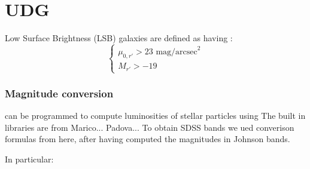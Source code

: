 \chapter{UDG}

Low Surface Brightness (LSB) galaxies are defined as having \citep{Venhola2017}:
\begin{equation}
\begin{cases}
 \mu_{0,r'} > 23 \mbox{ mag/arcsec}^2\\

 M_{r'} > -19
\end{cases}
\end{equation}



\subsection{Magnitude conversion}
\pynbody{} can be programmed to compute luminosities of stellar particles using 
The built in libraries are from Marico... Padova... %
To obtain SDSS bands we ued converison formulas from here, after having computed the magnitudes in Johnson bands.

In particular:

